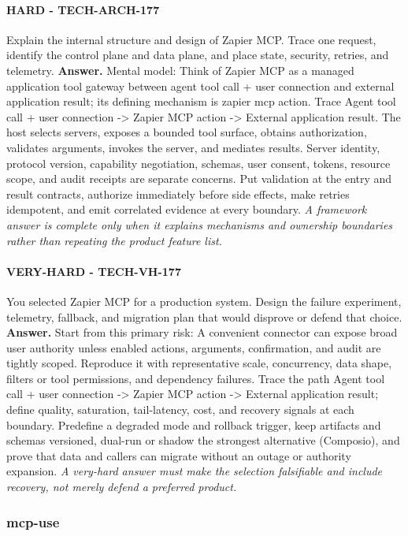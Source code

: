 \paragraph{HARD - TECH-ARCH-177} Explain the internal structure and design of Zapier MCP. Trace one request, identify the control plane and data plane, and place state, security, retries, and telemetry.
\textbf{Answer.} Mental model: Think of Zapier MCP as a managed application tool gateway between agent tool call + user connection and external application result; its defining mechanism is zapier mcp action. Trace Agent tool call + user connection -> Zapier MCP action -> External application result. The host selects servers, exposes a bounded tool surface, obtains authorization, validates arguments, invokes the server, and mediates results. Server identity, protocol version, capability negotiation, schemas, user consent, tokens, resource scope, and audit receipts are separate concerns. Put validation at the entry and result contracts, authorize immediately before side effects, make retries idempotent, and emit correlated evidence at every boundary.
\textit{A framework answer is complete only when it explains mechanisms and ownership boundaries rather than repeating the product feature list.}
\paragraph{VERY-HARD - TECH-VH-177} You selected Zapier MCP for a production system. Design the failure experiment, telemetry, fallback, and migration plan that would disprove or defend that choice.
\textbf{Answer.} Start from this primary risk: A convenient connector can expose broad user authority unless enabled actions, arguments, confirmation, and audit are tightly scoped. Reproduce it with representative scale, concurrency, data shape, filters or tool permissions, and dependency failures. Trace the path Agent tool call + user connection -> Zapier MCP action -> External application result; define quality, saturation, tail-latency, cost, and recovery signals at each boundary. Predefine a degraded mode and rollback trigger, keep artifacts and schemas versioned, dual-run or shadow the strongest alternative (Composio), and prove that data and callers can migrate without an outage or authority expansion.
\textit{A very-hard answer must make the selection falsifiable and include recovery, not merely defend a preferred product.}
\subsubsection*{mcp-use}

